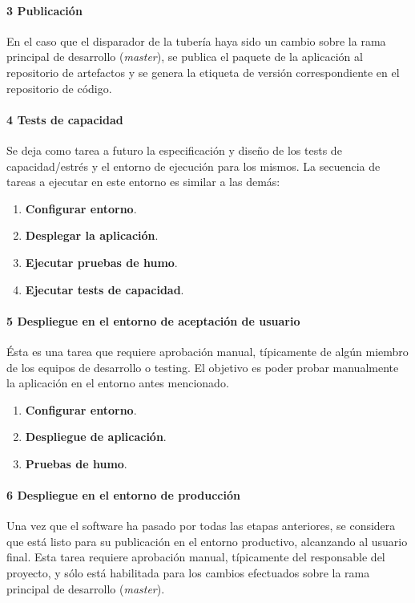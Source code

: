 \paragraph{3 Publicación}

En el caso que el disparador de la tubería haya sido un cambio sobre la rama principal de desarrollo (\textit{master}), se publica el paquete de la aplicación al repositorio de artefactos y se genera la etiqueta de versión correspondiente en el repositorio de código.

\paragraph{4 Tests de capacidad}

Se deja como tarea a futuro la especificación y diseño de los tests de capacidad/estrés y el entorno de ejecución para los mismos. La secuencia de tareas a ejecutar en este entorno es similar a las demás:

\begin{enumerate}
\item \textbf{Configurar entorno}.
\item \textbf{Desplegar la aplicación}.
\item \textbf{Ejecutar pruebas de humo}.
\item \textbf{Ejecutar tests de capacidad}.
\end{enumerate}
\paragraph{5 Despliegue en el entorno de aceptación de usuario}

Ésta es una tarea que requiere aprobación manual, típicamente de algún miembro de los equipos de desarrollo o testing. El objetivo es poder probar manualmente la aplicación en el entorno antes mencionado.

\begin{enumerate}
\item \textbf{Configurar entorno}.
\item \textbf{Despliegue de aplicación}.
\item \textbf{Pruebas de humo}.
\end{enumerate}
\paragraph{6 Despliegue en el entorno de producción}

Una vez que el software ha pasado por todas las etapas anteriores, se considera que está listo para su publicación en el entorno productivo, alcanzando al usuario final. Esta tarea requiere aprobación manual, típicamente del responsable del proyecto, y sólo está habilitada para los cambios efectuados sobre la rama principal de desarrollo (\textit{master}).

